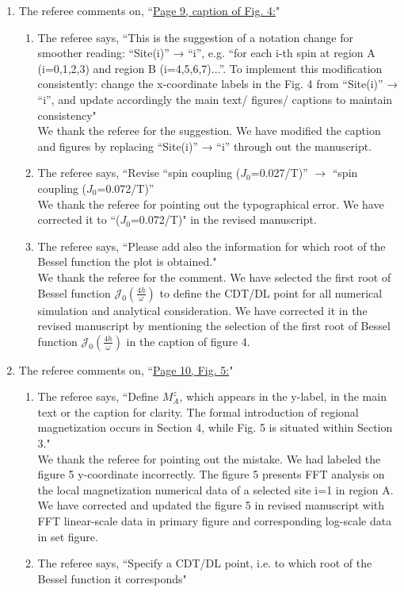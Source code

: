 \documentclass[aps,prb,reprint,showpacs,floatfix,superscriptaddress, onecolumn, nofootinbib, 10pt]{revtex4-2}
\newcommand{\response}[1]{{\color{black}#1}} %
\newcommand{\comment}[1]{{\color{blue}#1}} %
\begin{document}
\begin{enumerate}
\begin{enumerate}
		\item The referee comments on, \comment{``\underline{Page 9, caption of Fig. 4:}"}
		\begin{enumerate}
			\item The referee says, \comment{``This is the suggestion of a notation change for smoother reading: “Site(i)” → “i”, 
			e.g. “for each i-th spin at region A (i=0,1,2,3) and region B (i=4,5,6,7)...”. To implement this modification consistently: change the x-coordinate labels in the Fig. 4 from “Site(i)” → “i”, and update accordingly the main text/ figures/ captions to
			maintain consistency"}\\
		
			\response{We thank the referee for the suggestion. We have modified the caption and figures by replacing ``Site(i)” → ``i” through out the manuscript.}
			\item The referee says, \comment{``Revise “spin coupling ($J_0$=0.027/T)” $\rightarrow$ “spin coupling ($J_0$=0.072/T)”}\\
			
			\response{We thank the referee for pointing out the typographical error. We have corrected it to ``($J_0$=0.072/T)" in the revised manuscript.}\\
			\item The referee says, \comment{``Please add also the information for which root of the Bessel function the plot is obtained."}\\
			
			\response{We thank the referee for the comment. We have selected the first root of Bessel function $\mathcal{J}_0\left(\frac{4h}{\omega}\right)$ to define the CDT/DL point for all numerical simulation and analytical consideration. We have corrected it in the revised manuscript by mentioning the selection of the first root of Bessel function $\mathcal{J}_0\left(\frac{4h}{\omega}\right)$ in the caption of figure 4.}
		\end{enumerate}
		\item The referee comments on, \comment{``\underline{Page 10, Fig. 5:}"}
		\begin{enumerate}
			\item The referee says, \comment{``Define $M_A^z$, which appears in the y-label, in the main text or the caption for
			clarity. The formal introduction of regional magnetization occurs in Section 4, while Fig. 5 is situated within Section 3."}\\
		
			\response{We thank the referee for pointing out the mistake. We had labeled the figure 5 y-coordinate incorrectly. The figure 5 presents FFT analysis on the local magnetization numerical data of a selected site i=1 in region A. We have corrected and updated the figure 5 in revised manuscript with FFT linear-scale data in primary figure and corresponding log-scale data in set figure.}\\
			\item The referee says, \comment{``Specify a CDT/DL point, i.e. to which root of the Bessel function it corresponds"}\\
			

\end{enumerate}
\end{enumerate}
\end{enumerate}
\end{document}
